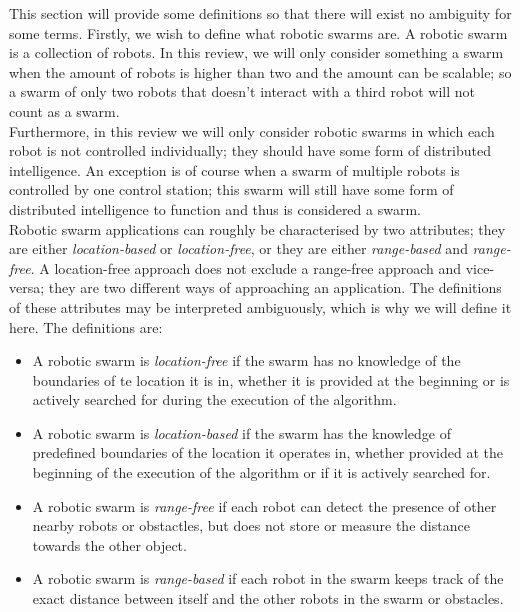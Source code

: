 This section will provide some definitions so that there will exist no ambiguity for some terms. Firstly, we wish to define what robotic swarms are. A robotic swarm is a collection of robots. In this review, we will only consider something a swarm when the amount of robots is higher than two and the amount can be scalable; so a swarm of only two robots that doesn't interact with a third robot will not count as a swarm.  \\
Furthermore, in this review we will only consider robotic swarms in which each robot is not controlled individually; they should have some form of distributed intelligence. An exception is of course when a swarm of multiple robots is controlled by one control station; this swarm will still have some form of distributed intelligence to function and thus is considered a swarm.  \\

Robotic swarm applications can roughly be characterised by two attributes; they are either \emph{location-based} or \emph{location-free}, or they are either \emph{range-based} and  \emph{range-free}. A location-free approach does not exclude a range-free approach and vice-versa; they are two different ways of approaching an application. The definitions of these attributes may be interpreted ambiguously, which is why we will define it here. The definitions are:

  \begin{itemize}
    \item A robotic swarm is \emph{location-free} if the swarm has no knowledge of the boundaries of te location it is in, whether it is provided at the beginning or is actively searched for during the execution of the algorithm. 
    \item A robotic swarm is \emph{location-based} if the swarm has the knowledge of predefined boundaries of the location it operates in, whether provided at the beginning of the execution of the algorithm or if it is actively searched for. 
    \item A robotic swarm is \emph{range-free} if each robot can detect the presence of other nearby robots or obstactles, but does not store or measure the distance towards the other object.
    \item A robotic swarm is \emph{range-based} if each robot in the swarm keeps track of the exact distance between itself and the other robots in the swarm or obstacles. 
  \end{itemize}
